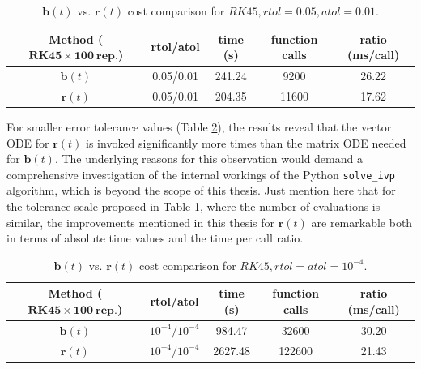 \begin{table}[ht]
            \bigskip
		\centering %
		\begin{tabular}{c c c c c} %
			\hline\hline %
			\textbf{Method ($\mathbf{RK45\times 100~rep.}$)} & \textbf{rtol/atol} & \textbf{time (s)} & \textbf{function calls} & \textbf{ratio (ms/call)} \\ [0.1ex] %
			\hline\hline 
			$\mathbf{b}(t)$ & 0.05/0.01 & 241.24 & 9200 & 26.22 \\ %
			$\mathbf{r}(t)$ & 0.05/0.01 & 204.35 & 11600 & 17.62 \\ [0.5ex] %
			\hline %
		\end{tabular}
		\caption{$\mathbf{b}(t)$ vs. $\mathbf{r}(t)$ cost comparison for $RK45, rtol=0.05, atol=0.01$.} 
       \label{table:btrt} 
\end{table}

\newpage

For smaller error tolerance values (Table \ref{table:btrt2}), the results reveal that the vector ODE for $\mathbf{r}(t)$ is invoked significantly more times than the matrix ODE needed for $\mathbf{b}(t)$. The underlying reasons for this observation would demand a comprehensive investigation of the internal workings of the Python \texttt{solve\_ivp} algorithm, which is beyond the scope of this thesis. Just mention here that for the tolerance scale proposed in Table \ref{table:btrt}, where the number of evaluations is similar, the improvements mentioned in this thesis for $\mathbf{r}(t)$ are remarkable both in terms of absolute time values and the time per call ratio.

\begin{table}[ht]
            \bigskip
		\centering %
		\begin{tabular}{c c c c c} %
			\hline\hline %
			\textbf{Method ($\mathbf{RK45\times 100~rep.}$)} & \textbf{rtol/atol} & \textbf{time (s)} & \textbf{function calls} & \textbf{ratio (ms/call)} \\ [0.1ex] %
			\hline\hline 
			$\mathbf{b}(t)$ & $10^{-4}/10^{-4}$ & 984.47 & 32600 & 30.20 \\ %
			$\mathbf{r}(t)$ & $10^{-4}/10^{-4}$ & 2627.48 & 122600 & 21.43 \\ [0.5ex] %
			\hline %
		\end{tabular}
		\caption{$\mathbf{b}(t)$ vs. $\mathbf{r}(t)$ cost comparison for $RK45, rtol=atol=10^{-4}$.} 
       \label{table:btrt2} 
\end{table}

